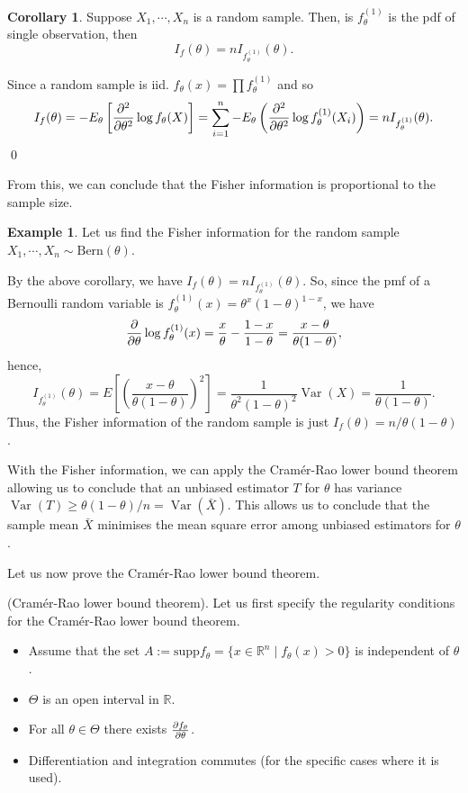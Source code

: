 \documentclass[
]{article}
\theoremstyle{definition}
\newtheorem{corollary}{Corollary}[theorem]
\newtheorem{example}{Example}
\theoremstyle{definition}
\begin{document}
\begin{corollary}
  Suppose \(X_1, \cdots, X_n\) is a random sample. Then, is \(f_\theta^{(1)}\) is 
  the pdf of single observation, then 
  \[I_f(\theta) = n I_{f_\theta^{(1)}}(\theta).\]
\end{corollary}
\proof

Since a random sample is iid. \(f_\theta(x) = \prod f_\theta^{(1)}\) and
so
\[I_{f}(\theta) = -E_\theta\left[\pdv[2]{\theta}\log f_\theta(X) \right] 
    = \sum_{i = 1}^n - E_\theta\left(\pdv[2]{\theta} \log f_\theta^{(1)}(X_i)\right)
    = n I_{f_\theta^{(1)}}(\theta).\] \qed

From this, we can conclude that the Fisher information is proportional
to the sample size.

\begin{example}
  Let us find the Fisher information for the random sample 
  \(X_1, \cdots, X_n \sim \text{Bern}(\theta)\).
  
  By the above corollary, we have \(I_f(\theta) = n I_{f_\theta^{(1)}}(\theta)\).
  So, since the pmf of a Bernoulli random variable is 
  \(f_{\theta}^{(1)}(x) = \theta^x(1 - \theta)^{1 - x}\), we have 
  \[\pdv{\theta} \log f_\theta^{(1)}(x) = \frac{x}{\theta} - \frac{1 - x}{1 - \theta} 
    = \frac{x - \theta}{\theta(1 - \theta)},\]
  hence,
  \[I_{f_\theta^{(1)}}(\theta) = E\left[\left(\frac{x - \theta}{\theta(1 - \theta)}\right)^2\right] 
    = \frac{1}{\theta^2(1 - \theta)^2} \mathop{\mathrm{Var}}(X) = \frac{1}{\theta(1 - \theta)}.\]
  Thus, the Fisher information of the random sample is just 
  \(I_f(\theta) = n / \theta(1 - \theta)\).

  With the Fisher information, we can apply the Cramér-Rao lower bound theorem 
  allowing us to conclude that an unbiased estimator \(T\) for \(\theta\) has variance 
  \(\mathop{\mathrm{Var}}(T) \ge \theta(1 - \theta) / n = \mathop{\mathrm{Var}}(\bar{X})\). This allows us to conclude 
  that the sample mean \(\bar{X}\) minimises the mean square error among unbiased 
  estimators for \(\theta\). 
\end{example}

Let us now prove the Cramér-Rao lower bound theorem.

\proof (Cramér-Rao lower bound theorem). Let us first specify the
regularity conditions for the Cramér-Rao lower bound theorem.

\begin{itemize}
    \item Assume that the set \(A := \text{supp} f_\theta = \{x \in \mathbb{R}^n \mid f_\theta(x) > 0\}\)
      is independent of \(\theta\).
    \item \(\Theta\) is an open interval in \(\mathbb{R}\).
    \item For all \(\theta \in \Theta\) there exists \(\pdv{f_\theta}{\theta}\).
    \item Differentiation and integration commutes (for the specific cases where it 
      is used).
  \end{itemize}
\end{document}
